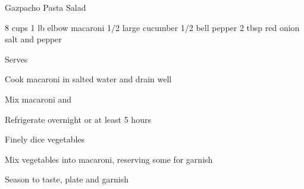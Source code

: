 \begin{recipe}{Gazpacho Pasta Salad}{}
\begin{ingredients}
8 cups 
1 lb elbow macaroni
1/2 large cucumber
1/2 bell pepper
2 tbsp red onion
salt and pepper
\end{ingredients}
\nextcolumn
Serves
\begin{steps}
    \item Cook macaroni in salted water and drain well
    \item Mix macaroni and 
    \item Refrigerate overnight or at least 5 hours
    \item Finely dice vegetables
    \item Mix vegetables into macaroni, reserving some for garnish
    \item  Season to taste, plate and garnish
\end{steps}
\end{recipe}
